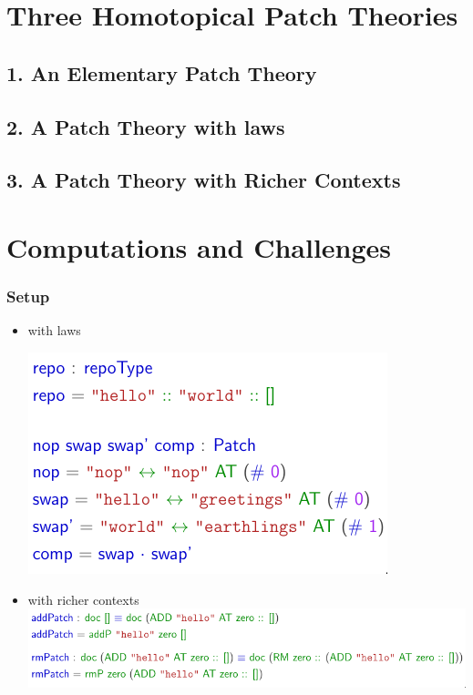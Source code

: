 \documentclass{beamer}
\begin{document}
\section{Three Homotopical Patch Theories}

\subsection{1. An Elementary Patch Theory}


\subsection{2. A Patch Theory with laws}


\subsection{3. A Patch Theory with Richer Contexts}


\section{Computations and Challenges}

\begin{frame}
  \frametitle{Setup}
  \begin{itemize}
  \item with laws
    
    \includegraphics[width=.6\textwidth]{figures/laws-setup}
  \item with richer contexts
    \includegraphics[width=\textwidth]{figures/richer-setup}
  \end{itemize}
\end{frame}
\end{document}
